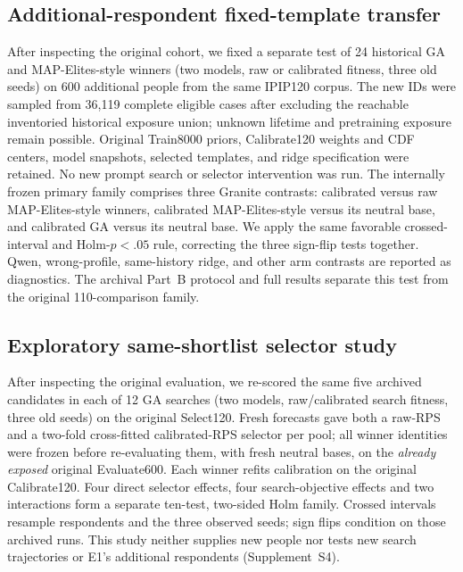 \documentclass[10pt,twocolumn]{article}
\newcommand{\ArchivalApp}{Supplement~S4}
\begin{document}
\subsection{Additional-respondent fixed-template transfer}
After inspecting the original cohort, we fixed a separate test of 24 historical
GA and MAP-Elites-style winners (two models, raw or calibrated fitness, three
old seeds) on 600 additional people from the same IPIP120 corpus. The new IDs
were sampled from 36,119 complete eligible cases after excluding the reachable
inventoried historical exposure union; unknown lifetime and pretraining
exposure remain possible. Original Train8000 priors, Calibrate120 weights and
CDF centers, model snapshots, selected templates, and ridge specification
were retained. No new prompt search or selector intervention was run. The
internally frozen primary family comprises three Granite contrasts:
calibrated versus raw MAP-Elites-style winners, calibrated MAP-Elites-style
versus its neutral base, and calibrated GA versus its neutral base. We apply
the same favorable crossed-interval and Holm-$p<.05$ rule, correcting the
three sign-flip tests together. Qwen, wrong-profile, same-history ridge, and
other arm contrasts are reported as diagnostics. The archival Part~B protocol
and full results separate this test from the original 110-comparison family.

\subsection{Exploratory same-shortlist selector study}
After inspecting the original evaluation, we re-scored the same five archived
candidates in each of 12 GA searches (two models, raw/calibrated search
fitness, three old seeds) on the original Select120. Fresh forecasts gave
both a raw-RPS and a two-fold cross-fitted calibrated-RPS selector per pool;
all winner identities were frozen before re-evaluating them, with fresh
neutral bases, on the \emph{already exposed} original Evaluate600. Each
winner refits calibration on the original Calibrate120. Four direct selector
effects, four search-objective effects and two interactions form a separate
ten-test, two-sided Holm family. Crossed intervals resample respondents and
the three observed seeds; sign flips condition on those archived runs. This
study neither supplies new people nor tests new search trajectories or E1's
additional respondents (\ArchivalApp).
\end{document}
